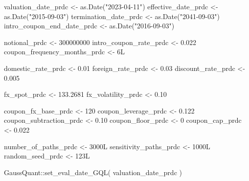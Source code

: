 \documentclass[
  letterpaper,
  DIV=11,
  numbers=noendperiod]{scrreprt}
\newenvironment{Shaded}{\begin{snugshade}}{\end{snugshade}}
\newcommand{\DecValTok}[1]{\textcolor[rgb]{0.68,0.00,0.00}{#1}}
\newcommand{\FloatTok}[1]{\textcolor[rgb]{0.68,0.00,0.00}{#1}}
\newcommand{\FunctionTok}[1]{\textcolor[rgb]{0.28,0.35,0.67}{#1}}
\newcommand{\NormalTok}[1]{\textcolor[rgb]{0.00,0.23,0.31}{#1}}
\newcommand{\OtherTok}[1]{\textcolor[rgb]{0.00,0.23,0.31}{#1}}
\newcommand{\SpecialCharTok}[1]{\textcolor[rgb]{0.37,0.37,0.37}{#1}}
\newcommand{\StringTok}[1]{\textcolor[rgb]{0.13,0.47,0.30}{#1}}
\begin{document}
\begin{Shaded}
\begin{Highlighting}[]
\NormalTok{valuation\_date\_prdc }\OtherTok{\textless{}{-}} \FunctionTok{as.Date}\NormalTok{(}\StringTok{"2023{-}04{-}11"}\NormalTok{)}
\NormalTok{effective\_date\_prdc }\OtherTok{\textless{}{-}} \FunctionTok{as.Date}\NormalTok{(}\StringTok{"2015{-}09{-}03"}\NormalTok{)}
\NormalTok{termination\_date\_prdc }\OtherTok{\textless{}{-}} \FunctionTok{as.Date}\NormalTok{(}\StringTok{"2041{-}09{-}03"}\NormalTok{)}
\NormalTok{intro\_coupon\_end\_date\_prdc }\OtherTok{\textless{}{-}} \FunctionTok{as.Date}\NormalTok{(}\StringTok{"2016{-}09{-}03"}\NormalTok{)}

\NormalTok{notional\_prdc }\OtherTok{\textless{}{-}} \DecValTok{300000000}
\NormalTok{intro\_coupon\_rate\_prdc }\OtherTok{\textless{}{-}} \FloatTok{0.022}
\NormalTok{coupon\_frequency\_months\_prdc }\OtherTok{\textless{}{-}} \DecValTok{6}\NormalTok{L}

\NormalTok{domestic\_rate\_prdc }\OtherTok{\textless{}{-}} \FloatTok{0.01}
\NormalTok{foreign\_rate\_prdc }\OtherTok{\textless{}{-}} \FloatTok{0.03}
\NormalTok{discount\_rate\_prdc }\OtherTok{\textless{}{-}} \FloatTok{0.005}

\NormalTok{fx\_spot\_prdc }\OtherTok{\textless{}{-}} \FloatTok{133.2681}
\NormalTok{fx\_volatility\_prdc }\OtherTok{\textless{}{-}} \FloatTok{0.10}

\NormalTok{coupon\_fx\_base\_prdc }\OtherTok{\textless{}{-}} \DecValTok{120}
\NormalTok{coupon\_leverage\_prdc }\OtherTok{\textless{}{-}} \FloatTok{0.122}
\NormalTok{coupon\_subtraction\_prdc }\OtherTok{\textless{}{-}} \FloatTok{0.10}
\NormalTok{coupon\_floor\_prdc }\OtherTok{\textless{}{-}} \DecValTok{0}
\NormalTok{coupon\_cap\_prdc }\OtherTok{\textless{}{-}} \FloatTok{0.022}

\NormalTok{number\_of\_paths\_prdc }\OtherTok{\textless{}{-}} \DecValTok{3000}\NormalTok{L}
\NormalTok{sensitivity\_paths\_prdc }\OtherTok{\textless{}{-}} \DecValTok{1000}\NormalTok{L}
\NormalTok{random\_seed\_prdc }\OtherTok{\textless{}{-}} \DecValTok{123}\NormalTok{L}

\NormalTok{GaussQuant}\SpecialCharTok{::}\FunctionTok{set\_eval\_date\_GQL}\NormalTok{(}
\NormalTok{  valuation\_date\_prdc}
\NormalTok{)}


\end{Highlighting}
\end{Shaded}
\end{document}
